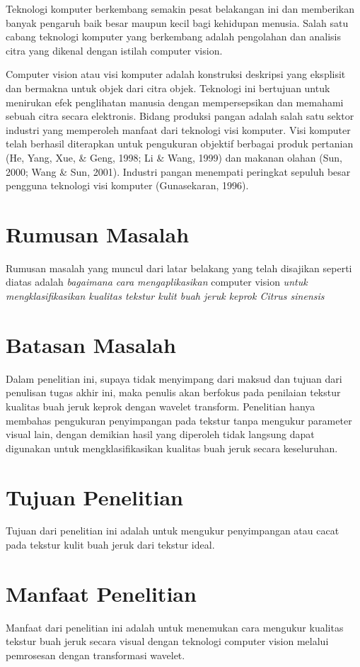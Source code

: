 \documentclass[laporan.tex]{subfiles}
\begin{document}
Teknologi komputer berkembang semakin pesat belakangan ini dan memberikan banyak pengaruh baik besar maupun kecil bagi kehidupan menusia. Salah satu cabang teknologi komputer yang berkembang adalah pengolahan dan analisis citra yang dikenal dengan istilah computer vision.

Computer vision atau visi komputer adalah konstruksi deskripsi yang eksplisit dan bermakna untuk objek dari citra objek. Teknologi ini bertujuan untuk menirukan efek penglihatan manusia dengan mempersepsikan dan memahami sebuah citra secara elektronis.
Bidang produksi pangan adalah salah satu sektor industri yang memperoleh manfaat dari teknologi visi komputer. Visi komputer telah berhasil diterapkan untuk pengukuran objektif berbagai produk pertanian (He, Yang, Xue, \& Geng, 1998; Li \& Wang, 1999) dan makanan olahan (Sun, 2000; Wang \& Sun, 2001). Industri pangan menempati peringkat sepuluh besar pengguna teknologi visi komputer (Gunasekaran, 1996).


\section{Rumusan Masalah}

Rumusan masalah yang muncul dari latar belakang yang telah disajikan seperti diatas adalah \emph{bagaimana cara mengaplikasikan} computer vision \emph{untuk mengklasifikasikan kualitas tekstur kulit buah jeruk keprok Citrus sinensis}

\section{Batasan Masalah}

Dalam penelitian ini, supaya tidak menyimpang dari maksud dan tujuan dari penulisan tugas akhir ini, maka penulis akan berfokus pada penilaian tekstur kualitas buah jeruk keprok dengan wavelet transform. Penelitian hanya membahas pengukuran penyimpangan pada tekstur tanpa mengukur parameter visual lain, dengan demikian hasil yang diperoleh tidak langsung dapat digunakan untuk mengklasifikasikan kualitas buah jeruk secara keseluruhan.

\section{Tujuan Penelitian}

Tujuan dari penelitian ini adalah untuk mengukur penyimpangan atau cacat pada tekstur kulit buah jeruk dari tekstur ideal.

\section{Manfaat Penelitian}

Manfaat dari penelitian ini adalah untuk menemukan cara mengukur kualitas tekstur buah jeruk secara visual dengan teknologi computer vision melalui pemrosesan dengan transformasi wavelet.
\end{document}
